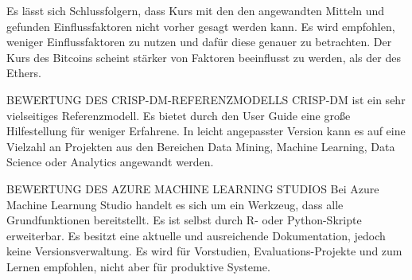 Es lässt sich Schlussfolgern, dass Kurs mit den den angewandten Mitteln und gefunden Einflussfaktoren nicht vorher gesagt werden kann. Es wird empfohlen, weniger Einflussfaktoren zu nutzen und dafür diese genauer zu betrachten. Der Kurs des Bitcoins scheint stärker von Faktoren beeinflusst zu werden, als der des Ethers.

{\normalsize BEWERTUNG DES CRISP-DM-REFERENZMODELLS} \newline
CRISP-DM ist ein sehr vielseitiges Referenzmodell. Es bietet durch den User Guide eine große Hilfestellung für weniger Erfahrene. In leicht angepasster Version kann es auf eine Vielzahl an Projekten aus den Bereichen Data Mining, Machine Learning, Data Science oder Analytics angewandt werden.

{\normalsize BEWERTUNG DES AZURE MACHINE LEARNING STUDIOS} \newline
Bei Azure Machine Learnung Studio handelt es sich um ein Werkzeug, dass alle Grundfunktionen bereitstellt. Es ist selbst durch R- oder Python-Skripte erweiterbar. Es besitzt eine aktuelle und ausreichende Dokumentation, jedoch keine Versionsverwaltung. Es wird für Vorstudien, Evaluations-Projekte und zum Lernen empfohlen, nicht aber für produktive Systeme.
